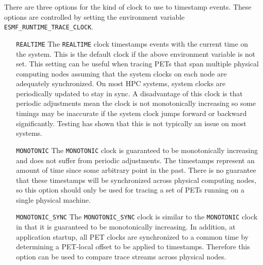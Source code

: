 There are three options for the kind of clock to use to timestamp
events. These options are controlled by setting the environment variable
{\tt ESMF\_RUNTIME\_TRACE\_CLOCK}.
\begin{itemize}
\item [{\tt REALTIME}] The {\tt REALTIME} clock timestamps events with the current time on
      the system.  This is the default clock if the above environment
      variable is not set.  This setting can be useful when tracing PETs that
      span multiple physical computing nodes assuming that the system clocks
      on each node are adequately synchronized.  On most HPC systems, system
      clocks are periodically updated to stay in sync.  A disadvantage of this
      clock is that periodic adjustments mean the clock is not monotonically
      increasing so some timings may be inaccurate if the system clock jumps
      forward or backward significantly. Testing has shown that this is not
      typically an issue on most systems.
\item [{\tt MONOTONIC}] The {\tt MONOTONIC} clock is guaranteed to be monotonically increasing
      and does not suffer from periodic adjustments.  The timestamps represent
      an amount of time since some arbitrary point in the past.  There is no
      guarantee that these timestamps will be synchronized across physical
      computing nodes, so this option should only be used for tracing a set of PETs
      running on a single physical machine.
\item [{\tt MONOTONIC\_SYNC}] The {\tt MONOTONIC\_SYNC} clock is similar to the {\tt MONOTONIC} clock
      in that it is guaranteed to be monotonically increasing. In addition, at
      application startup, all PET clocks are synchronized to a common time
      by determining a PET-local offset to be applied to timestamps. Therefore this option
      can be used to compare trace streams across physical nodes.     
\end{itemize}
